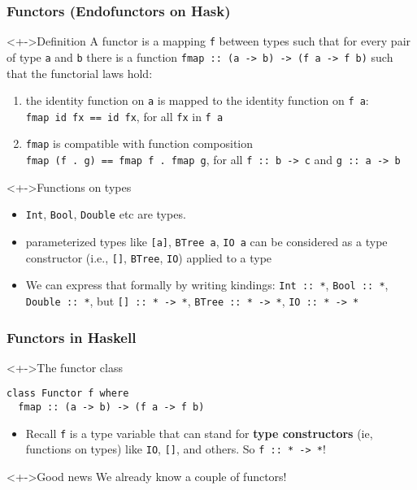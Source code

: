 \documentclass{beamer}
\begin{document}
\begin{frame}[fragile]
  \frametitle{Functors (Endofunctors on Hask)}
  \begin{block}<+->{Definition}
    A \alert{functor} is a mapping \lstinline{f} between types such that for
    every pair of type \lstinline{a} and \lstinline|b| there is a
    function 
    \lstinline|fmap :: (a -> b) -> (f a -> f b)|
    such that the \alert{functorial laws} hold:
    \begin{enumerate}
    \item the identity function on \lstinline|a| is mapped to the
      identity function on \lstinline|f a|:\\
      \lstinline|fmap id fx == id fx|, \quad for all \lstinline|fx| in
      \lstinline|f a|
    \item \lstinline|fmap| is compatible with function composition\\
      \lstinline|fmap (f . g) == fmap f . fmap g|, \quad for all
      \lstinline|f :: b -> c| and \lstinline|g :: a -> b|
    \end{enumerate}
  \end{block}
  \begin{alertblock}<+->{Functions on types}
    \begin{itemize}
    \item \lstinline{Int}, \lstinline{Bool}, \lstinline{Double} etc
      are types.
    \item parameterized types like \lstinline$[a]$,
      \lstinline$BTree a$, \lstinline$IO a$ can be considered as a
      type constructor (i.e., \lstinline$[]$, \lstinline$BTree$,
      \lstinline$IO$) applied to a type 
    \item We can express that formally by writing \alert{kindings}:
      \lstinline{Int :: *},
      \lstinline{Bool :: *},
      \lstinline{Double :: *}, but
      \lstinline{[] :: * -> *},
      \lstinline{BTree :: * -> *},
      \lstinline{IO :: * -> *}
    \end{itemize}
  \end{alertblock}
\end{frame}

\begin{frame}[fragile]
  \frametitle{Functors in Haskell}
\begin{alertblock}<+->{The functor class}
\begin{lstlisting}
class Functor f where
  fmap :: (a -> b) -> (f a -> f b)
\end{lstlisting}
    \begin{itemize}
  \item Recall \texttt{f} is a type variable that can
    stand for \textbf{type
      constructors} (ie, functions on types) like  \texttt{IO},
    \texttt{[]}, and others.  So \lstinline|f :: * -> *|!
  \end{itemize}
\end{alertblock}
\begin{exampleblock}<+->{Good news}
  We already know a couple of functors!
\end{exampleblock}
\end{frame}
\end{document}
